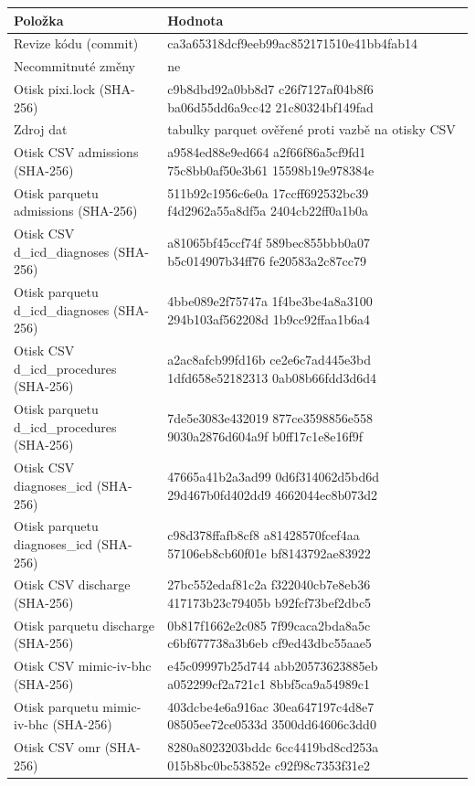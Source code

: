 \begin{tabular}{>{\raggedright\arraybackslash}p{}>{\raggedright\arraybackslash}p{}}
\toprule
Položka & Hodnota\\
\midrule
Revize kódu (commit) & ca3a65318dcf9eeb99ac852171510e41bb4fab14\\
Necommitnuté změny & ne\\
Otisk pixi.lock (SHA-256) & c9b8dbd92a0bb8d7 c26f7127af04b8f6 ba06d55dd6a9cc42 21c80324bf149fad\\
Zdroj dat & tabulky parquet ověřené proti vazbě na otisky CSV\\
Otisk CSV admissions (SHA-256) & a9584ed88e9ed664 a2f66f86a5cf9fd1 75c8bb0af50e3b61 15598b19e978384e\\
Otisk parquetu admissions (SHA-256) & 511b92c1956c6e0a 17ccff692532bc39 f4d2962a55a8df5a 2404cb22ff0a1b0a\\
Otisk CSV d\_icd\_diagnoses (SHA-256) & a81065bf45ccf74f 589bec855bbb0a07 b5c014907b34ff76 fe20583a2c87cc79\\
Otisk parquetu d\_icd\_diagnoses (SHA-256) & 4bbe089e2f75747a 1f4be3be4a8a3100 294b103af562208d 1b9cc92ffaa1b6a4\\
Otisk CSV d\_icd\_procedures (SHA-256) & a2ac8afcb99fd16b ce2e6c7ad445e3bd 1dfd658e52182313 0ab08b66fdd3d6d4\\
Otisk parquetu d\_icd\_procedures (SHA-256) & 7de5e3083e432019 877ce3598856e558 9030a2876d604a9f b0ff17c1e8e16f9f\\
Otisk CSV diagnoses\_icd (SHA-256) & 47665a41b2a3ad99 0d6f314062d5bd6d 29d467b0fd402dd9 4662044ec8b073d2\\
Otisk parquetu diagnoses\_icd (SHA-256) & c98d378ffafb8cf8 a81428570fcef4aa 57106eb8cb60f01e bf8143792ae83922\\
Otisk CSV discharge (SHA-256) & 27bc552edaf81c2a f322040cb7e8eb36 417173b23c79405b b92fcf73bef2dbc5\\
Otisk parquetu discharge (SHA-256) & 0b817f1662e2c085 7f99caca2bda8a5c c6bf677738a3b6eb cf9ed43dbc55aae5\\
Otisk CSV mimic-iv-bhc (SHA-256) & e45c09997b25d744 abb20573623885eb a052299cf2a721c1 8bbf5ca9a54989c1\\
Otisk parquetu mimic-iv-bhc (SHA-256) & 403dcbe4e6a916ac 30ea647197c4d8e7 08505ee72ce0533d 3500dd64606c3dd0\\
Otisk CSV omr (SHA-256) & 8280a8023203bddc 6cc4419bd8cd253a 015b8bc0bc53852e c92f98c7353f31e2\\

\end{tabular}
